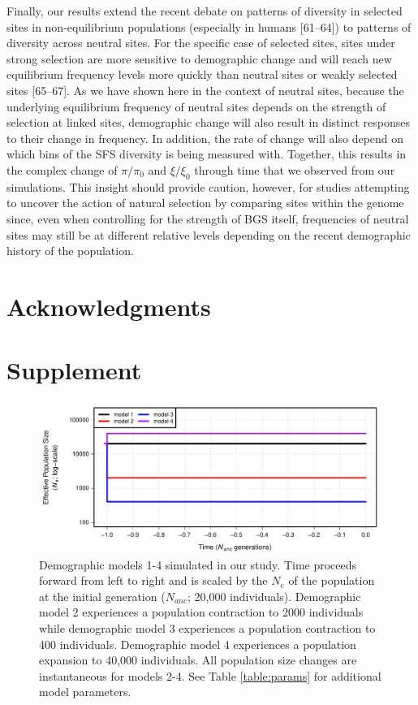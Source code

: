 \documentclass[9pt,twocolumn,twoside]{rilabRxiv}
\newcommand{\beginsupplement}{%
        \setcounter{table}{0}
        \renewcommand{\thetable}{S\arabic{table}}%
        \setcounter{figure}{0}
        \renewcommand{\thefigure}{S\arabic{figure}}%
     }
\begin{document}
Finally, our results extend the recent
debate on patterns of diversity in selected sites in non-equilibrium
populations (especially in humans [61--64]) to patterns of diversity
across neutral sites. For the specific case of selected sites, sites
under strong selection are more sensitive to demographic change and will
reach new equilibrium frequency levels more quickly than neutral sites
or weakly selected sites [65--67]. As we have shown here in the
context of neutral sites, because the underlying equilibrium frequency
of neutral sites depends on the strength of selection at linked sites,
demographic change will also result in distinct responses to their
change in frequency. In addition, the rate of change will also depend on
which bins of the SFS diversity is being measured with. Together, this
results in the complex change of $\pi/\pi_0$ and
$\xi/\xi_0$ through time that we observed from our simulations.
This insight should provide caution, however, for studies attempting to
uncover the action of natural selection by comparing sites within the
genome since, even when controlling for the strength of BGS itself,
frequencies of neutral sites may still be at different relative levels
depending on the recent demographic history of the population.

\section{Acknowledgments}




\onecolumn

\beginsupplement
\section*{Supplement}

\begin{figure}[h!]
\includegraphics[width=0.8\linewidth]{figures/FigS1.pdf}
\caption{Demographic models 1-4 simulated in our study.
Time proceeds forward from left to right and is scaled by the $N_e$ of the population at the initial generation ($N_{anc}$; 20,000 individuals).
Demographic model 2 experiences a population contraction to 2000 individuals while demographic model 3 experiences a population contraction to 400 individuals.
Demographic model 4 experiences a population expansion to 40,000 individuals.
All population size changes are instantaneous for models 2-4.
See Table \ref{table:params} for additional model parameters.}
\label{fig:S1}
\end{figure}
\pagebreak
\end{document}
